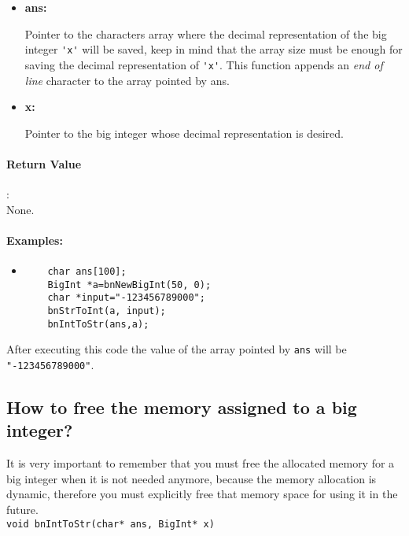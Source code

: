 \documentclass{book}
\begin{document}
\begin{itemize}
\item{\bf ans:}

Pointer to the characters array where the decimal representation of the big integer \verb+'x'+ will be saved, keep in mind that the array size must be enough for saving the decimal representation of \verb+'x'+. This  function appends an \emph{end of line} character to the array pointed by ans.

\item {\bf x:}

Pointer to the big integer whose decimal representation is desired.

\end{itemize}

\paragraph{Return Value}:\\

None.

\paragraph{Examples:}

\begin{itemize}
\item

\begin{verbatim}
	char ans[100];
	BigInt *a=bnNewBigInt(50, 0);
	char *input="-123456789000";
	bnStrToInt(a, input);
	bnIntToStr(ans,a);
\end{verbatim}
\end{itemize}

After executing this code the value of the array pointed by \verb+ans+ will be \verb+"-123456789000"+.

\subsection{How to free the memory assigned to a big integer?}

It is very important to remember that you must free the allocated memory for a big integer when it is not needed anymore, because the memory allocation is dynamic, therefore you must explicitly free that memory space for using it in the future.\\

\verb+void bnIntToStr(char* ans, BigInt* x)+\\
\end{document}
